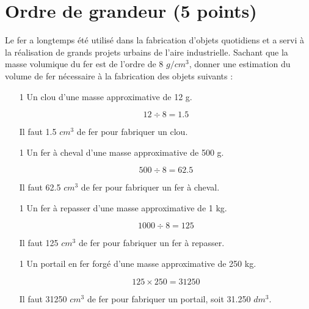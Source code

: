 \section{Ordre de grandeur (5 points)}\label{ex:grandeur}

Le fer a longtemps été utilisé dans la fabrication d'objets quotidiens et a servi à la réalisation de grands projets urbains de l'aire industrielle. Sachant que la masse volumique du fer est de l'ordre de 8 $g/cm^3$, donner une estimation du volume de fer nécessaire à la fabrication des objets suivants :

\begin{enumerate}
	\item[1] Un clou d'une masse approximative de 12 g.
	
	\begin{solution}
		\begin{equation}
			12 \div 8 = 1.5
		\end{equation}
		
		Il faut \num{1.5} $cm^3$ de fer pour fabriquer un clou.
	\end{solution}
	
	\item[1] Un fer à cheval d'une masse approximative de 500 g.
	\begin{solution}
		\begin{equation}
			500 \div 8 = \num{62.5}
		\end{equation}
		
		Il faut \num{62.5} $cm^3$ de fer pour fabriquer un fer à cheval.
	\end{solution}

	\item[1] Un fer à repasser d'une masse approximative de 1 kg.
	\begin{solution}
		\begin{equation}
			1000 \div 8 = \num{125}
		\end{equation}
		
		Il faut \num{125} $cm^3$ de fer pour fabriquer un fer à repasser.
	\end{solution}

	\item[1] Un portail en fer forgé d'une masse approximative de 250 kg.
	\begin{solution}
		\begin{equation}
			125 \times 250 = \num{31250}
		\end{equation}
		
		Il faut \num{31250} $cm^3$ de fer pour fabriquer un portail, soit \num{31,250} $dm^3$.
	\end{solution}


\end{enumerate}
